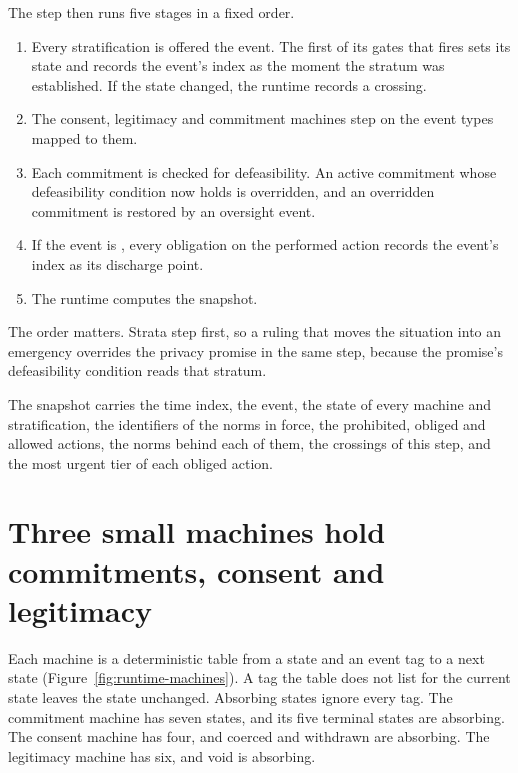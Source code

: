 The step then runs five stages in a fixed order.
\begin{enumerate}
\item Every stratification is offered the event. The first of its gates that fires sets its state and
records the event's index as the moment the stratum was established. If the state changed, the
runtime records a crossing.
\item The consent, legitimacy and commitment machines step on the event types mapped to them.
\item Each commitment is checked for defeasibility. An active commitment whose defeasibility
condition now holds is overridden, and an overridden commitment is restored by an oversight event.
\item If the event is , every obligation on the performed action records
the event's index as its discharge point.
\item The runtime computes the snapshot.
\end{enumerate}
The order matters. Strata step first, so a ruling that moves the situation into an emergency
overrides the privacy promise in the same step, because the promise's defeasibility condition reads
that stratum.

The snapshot carries the time index, the event, the state of every machine and stratification, the
identifiers of the norms in force, the prohibited, obliged and allowed actions, the norms behind each
of them, the crossings of this step, and the most urgent tier of each obliged action.

\section{Three small machines hold commitments, consent and legitimacy}\label{sec:runtime-machines}

Each machine is a deterministic table from a state and an event tag to a next state
(Figure~\ref{fig:runtime-machines}). A tag the table does not list for the current state leaves the
state unchanged. Absorbing states ignore every tag. The commitment machine has seven states, and its
five terminal states are absorbing. The consent machine has four, and coerced and withdrawn are
absorbing. The legitimacy machine has six, and void is absorbing.


